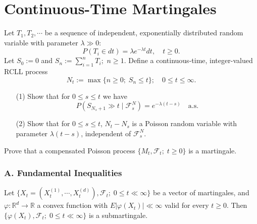 \documentclass{report}
\begin{document}
\section{Continuous-Time Martingales}
\setcounter{exe}{1}
\begin{prob}
	Let \( T_1,T_2,\dotsm \) be a sequence of independent, exponentially distributed random variable with parameter \( \lambda \gg 0 \):
	\[
		P(T_i \in dt)=\lambda e^{-\lambda t}dt, \quad t \ge 0.
	\]
	Let \( S_0:=0 \) and \( S_n:=\sum_{i=1}^{n}T_i; \) \( n \ge1 \).
	Define a continuous-time, integer-valued RCLL process
	\[N_t:=\max \{ n \ge 0; \; S_n\le t\};\quad 0\le t\le \infty.\]
	\begin{itemize}
		\item[(1)] Show that for \( 0\le s \le t \) we have
		      \[P(S_{N_s+1}\gg t \;|\; \mathscr{F}_s^N)=e^{-\lambda (t-s)}\quad \mathrm{a.s.}\]
		\item[(2)] Show that for \( 0\le s\le t \), \( N_t-N_s \) is a Poisson random variable with
		      parameter \( \lambda (t-s) \), independent of \( \mathscr{F}_s^N \).
	\end{itemize}
\end{prob}

\setcounter{exe}{3}
\begin{prob}
	Prove that a compensated Poisson process \( \{M_t, \mathscr{F}_t;\; t\ge0\} \)
	is a martingale.
\end{prob}

\subsubsection*{A. Fundamental Inequalities}

\setcounter{exe}{6}
\begin{prob}
	Let \( \{X_t=(X_t^{(1)},\dotsm,X_t^{(d)}),\mathscr{F}_t;\; 0\le t\ll \infty \} \) be a 
	vector of martingales, and \( \varphi:\mathbb{R}^d\to \mathbb{R} \) a convex function
	with \( E|\varphi(X_t)|\ll \infty \) valid for every \( t\ge 0. \)
	Then \( \{\varphi(X_t), \mathscr{F}_t;\; 0\le t\ll \infty \} \) is a submartingale.
\end{prob}
\end{document}

